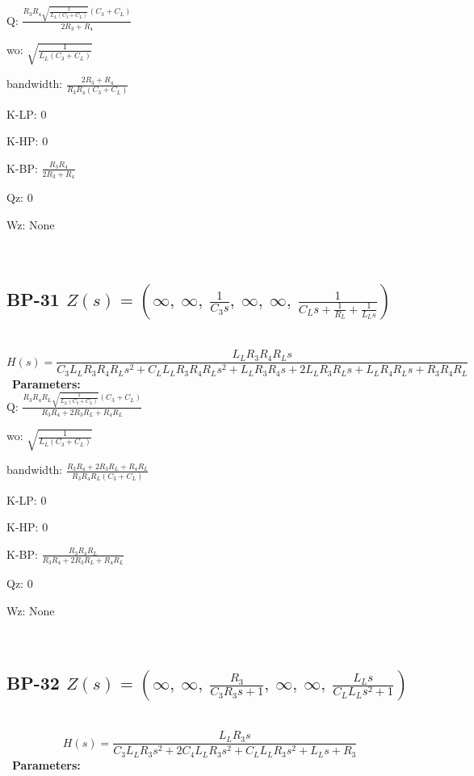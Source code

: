 \documentclass{article}
\begin{document}
Q: $\frac{R_{3} R_{4} \sqrt{\frac{1}{L_{L} \left(C_{3} + C_{L}\right)}} \left(C_{3} + C_{L}\right)}{2 R_{3} + R_{4}}$\ 

wo: $\sqrt{\frac{1}{L_{L} \left(C_{3} + C_{L}\right)}}$\ 

bandwidth: $\frac{2 R_{3} + R_{4}}{R_{3} R_{4} \left(C_{3} + C_{L}\right)}$\ 

K-LP: $0$\ 

K-HP: $0$\ 

K-BP: $\frac{R_{3} R_{4}}{2 R_{3} + R_{4}}$\ 

Qz: $0$\ 

Wz: $\text{None}$\ 

\ 

\subsection{BP-31 $Z(s) = \left( \infty, \  \infty, \  \frac{1}{C_{3} s}, \  \infty, \  \infty, \  \frac{1}{C_{L} s + \frac{1}{R_{L}} + \frac{1}{L_{L} s}}\right)$ } \ 
\textbf{\[H(s) = \frac{L_{L} R_{3} R_{4} R_{L} s}{C_{3} L_{L} R_{3} R_{4} R_{L} s^{2} + C_{L} L_{L} R_{3} R_{4} R_{L} s^{2} + L_{L} R_{3} R_{4} s + 2 L_{L} R_{3} R_{L} s + L_{L} R_{4} R_{L} s + R_{3} R_{4} R_{L}}\] } \ 
\textbf{Parameters:}\\ 

Q: $\frac{R_{3} R_{4} R_{L} \sqrt{\frac{1}{L_{L} \left(C_{3} + C_{L}\right)}} \left(C_{3} + C_{L}\right)}{R_{3} R_{4} + 2 R_{3} R_{L} + R_{4} R_{L}}$\ 

wo: $\sqrt{\frac{1}{L_{L} \left(C_{3} + C_{L}\right)}}$\ 

bandwidth: $\frac{R_{3} R_{4} + 2 R_{3} R_{L} + R_{4} R_{L}}{R_{3} R_{4} R_{L} \left(C_{3} + C_{L}\right)}$\ 

K-LP: $0$\ 

K-HP: $0$\ 

K-BP: $\frac{R_{3} R_{4} R_{L}}{R_{3} R_{4} + 2 R_{3} R_{L} + R_{4} R_{L}}$\ 

Qz: $0$\ 

Wz: $\text{None}$\ 

\ 

\subsection{BP-32 $Z(s) = \left( \infty, \  \infty, \  \frac{R_{3}}{C_{3} R_{3} s + 1}, \  \infty, \  \infty, \  \frac{L_{L} s}{C_{L} L_{L} s^{2} + 1}\right)$ } \ 
\textbf{\[H(s) = \frac{L_{L} R_{3} s}{C_{3} L_{L} R_{3} s^{2} + 2 C_{4} L_{L} R_{3} s^{2} + C_{L} L_{L} R_{3} s^{2} + L_{L} s + R_{3}}\] } \ 
\textbf{Parameters:}\\ 
\end{document}
